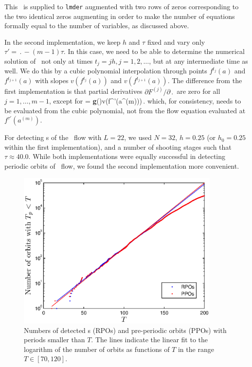 This \jacobianM\ is supplied to {\tt lmder}
augmented with two rows of zeros corresponding to the two identical
zeros augmenting  in order to make the number of
equations formally equal to the number of variables,
as discussed above.

In the second implementation, we keep $h$ and $\tau$ fixed and vary
only $\tau' = \period{} - (m-1)\tau$.  In this case, we need to be
able to determine the numerical solution of \KSe\ not only at times
$t_j = jh, j = 1, 2, \ldots$, but at any intermediate time as well.
We do this by a cubic polynomial interpolation through points
$f^{t_j}(a)$ and $f^{t_{j+1}}(a)$ with slopes $v(f^{t_j}(a))$ and
$v(f^{t_{j+1}}(a))$.  The difference from the first implementation
is that partial derivatives $\partial F^{(j)}/\partial \period{}$
are zero for all $j = 1,\ldots,m-1$, except for
\beq
   =
  {\bf g}(\shift)v(f^{\tau'}(a^{(m)}))\,.
\eeq
which, for consistency, needs to be evaluated from the cubic
polynomial, not from the flow equation evaluated
at $f^{\tau'}(a^{(m)})$.

For detecting \rpo s of the \KS\ flow with $L = 22$, we used
$N = 32$, $h = 0.25$ (or $h_0 = 0.25$ within the first implementation),
and a number of shooting stages such that $\tau \approx 40.0$.
While both implementations were equally successful in detecting
periodic orbits of \KS\ flow, we found the second implementation more
convenient.


\begin{figure}[t]
\begin{center}
\includegraphics[width=0.9\textwidth, clip=true]{figs/ks22_Npos_30k.eps}
\end{center}
\caption{
Numbers of detected \rpo s (RPOs) and pre-periodic orbits (PPOs)
with periods smaller than $T$.  The lines indicate the linear fit
to the logarithm of the number of orbits as functions of $T$ in the
range $T \in [70, 120]$.
     } \label{fig:Npos}
\end{figure}

